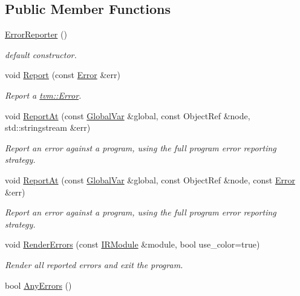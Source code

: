 \subsection*{Public Member Functions}
\begin{DoxyCompactItemize}
\item 
\hyperlink{classtvm_1_1ErrorReporter_aed0af73c114daa93db994ce2cfdc3fda}{Error\+Reporter} ()
\begin{DoxyCompactList}\small\item\em default constructor. \end{DoxyCompactList}\item 
void \hyperlink{classtvm_1_1ErrorReporter_ae2ec8c3bc8f31aa8495e81847981ed98}{Report} (const \hyperlink{classtvm_1_1Error}{Error} \&err)
\begin{DoxyCompactList}\small\item\em Report a \hyperlink{classtvm_1_1Error}{tvm\+::\+Error}. \end{DoxyCompactList}\item 
void \hyperlink{classtvm_1_1ErrorReporter_a3e1c300e60077c38bc9540dddcd1a019}{Report\+At} (const \hyperlink{classtvm_1_1GlobalVar}{Global\+Var} \&global, const Object\+Ref \&node, std\+::stringstream \&err)
\begin{DoxyCompactList}\small\item\em Report an error against a program, using the full program error reporting strategy. \end{DoxyCompactList}\item 
void \hyperlink{classtvm_1_1ErrorReporter_a844e1046cde72f227948f429852cde3e}{Report\+At} (const \hyperlink{classtvm_1_1GlobalVar}{Global\+Var} \&global, const Object\+Ref \&node, const \hyperlink{classtvm_1_1Error}{Error} \&err)
\begin{DoxyCompactList}\small\item\em Report an error against a program, using the full program error reporting strategy. \end{DoxyCompactList}\item 
void \hyperlink{classtvm_1_1ErrorReporter_a54699ec5f538bd207b5aa4e3f55181c6}{Render\+Errors} (const \hyperlink{classtvm_1_1IRModule}{I\+R\+Module} \&module, bool use\+\_\+color=true)
\begin{DoxyCompactList}\small\item\em Render all reported errors and exit the program. \end{DoxyCompactList}\item 
bool \hyperlink{classtvm_1_1ErrorReporter_a7ec11efb5e9680cfd57e05d573fc0927}{Any\+Errors} ()
\end{DoxyCompactItemize}


